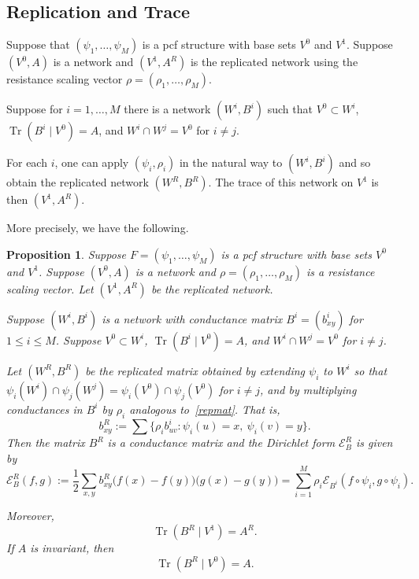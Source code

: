 \documentclass[a4paper]{amsart}
\theoremstyle{plain}
\newtheorem{proposition}[theorem]{Proposition}
\theoremstyle{definition}
\theoremstyle{remark}
\DeclareMathOperator{\Tr}{Tr}
\begin{document}
\subsection{Replication and Trace}  
Suppose that $ (\psi_1,\dots,\psi_M) $ is a pcf structure with base sets $ V^{0} $ and $ V^{1} $.  Suppose $ ( V^{0} ,  A) $ is a network and $ (V^{1} ,A^R) $ is the replicated network using the resistance scaling vector $ \rho = (\rho_1,\dots, \rho_M) $. 

Suppose  for $ i=1,\dots, M $ there is a network $ (W^i,B^i) $ such that $ V^{0} \subset W^i $, \mbox{$ \Tr(B^i\mid V^{0}) = A $}, and $ W^i\cap W^j = V^{0} $ for $ i\neq j $.

For each $ i $, one can apply   $ (\psi_i, \rho_i) $ in the natural way to  $ (W^i,B^i) $   and so obtain the replicated network $ (W^R,B^R ) $.  The trace of this network on $ V^{1} $ is then $ (V^{1} ,A^R) $.

\medskip
  More precisely, we have the following.

\begin{proposition} \label{proptr} Suppose $ F =(\psi_1,\dots, \psi_M) $ is a pcf structure with base sets $ V^{0} $ and $ V^{1} $.   Suppose $ (V^{0},A) $ is a network and  $ \rho = (\rho_1,\dots,\rho_M) $ is a resistance scaling vector.  
Let $ (V^{1}, A^R) $ be the replicated network.

Suppose   $ (W^i,B^i) $ is a network with conductance matrix $ B^i = (b^i_{xy}) $ for $ 1 \leq i \leq M $.
Suppose   $ V^{0} \subset W^i $, $ \Tr(B^i \mid V^{0}) = A $, and $ W^i\cap W^j = V^{0} $ for $ i\neq j $.

Let $ (W^R, B^R ) $ be the replicated matrix obtained by extending $ \psi_i $ to $ W^i $ so that 
$ \psi_i(W^i) \cap \psi_j(W^j) =  \psi_i(V^{0}) \cap \psi_j(V^{0})$ for $ i\neq j $, and by    
multiplying conductances in $ B^i $ by $ \rho_i $ analogous to~\eqref{repmat}. That is,
\begin{equation} \label{dfbi} 
b^R_{xy}:= \sum  \{\rho_i b^i_{uv} : \psi_i(u) = x, \ \psi_i(v) = y \}. 
\end{equation} 
Then the matrix $ B^R $ is a conductance matrix and 
the  Dirichlet form $ \mathcal{E}_B ^R $ is given by 
\begin{equation} \label{repm}
\mathcal{E} _B^R  (f,g):= \frac{1}{2} \sum_{x,y} b_{xy}^R\big(f(x) - f(y) \big) \big( g(x) - g(y) \big) 
= \sum_{i=1}^{M  } \rho_i \mathcal{E}_{B^i} (f \circ \psi_i , g \circ \psi_i  ) .
\end{equation} 

Moreover,
\begin{equation} \label{trba1}
\Tr\left(B^R\mid V^{1}\right) = A^R.
\end{equation} 
If $ A $ is invariant, then 
\begin{equation} \label{trba2} 
\Tr\left(B^R\mid V^{0}\right) = A.
\end{equation} 
\end{proposition} 
\end{document}
